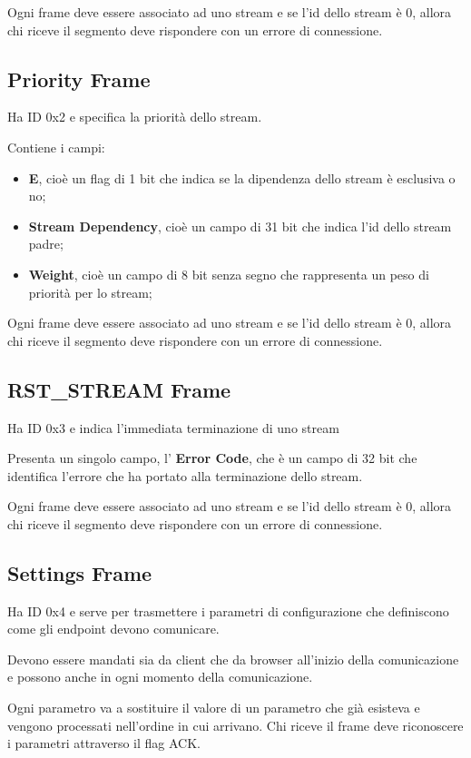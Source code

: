 \documentclass[12pt, a4paper]{article} %
\begin{document}
Ogni frame deve essere associato ad uno stream e se l'id dello stream è 0, allora chi riceve il segmento deve rispondere con un errore di connessione.

\subsection{Priority Frame}
Ha ID 0x2 e specifica la priorità dello stream.

Contiene i campi:
\begin{itemize}
  \item \textbf{E}, cioè un flag di 1 bit che indica se la dipendenza dello stream è esclusiva o no;
  \item \textbf{Stream Dependency}, cioè un campo di 31 bit che indica l'id dello stream padre;
  \item \textbf{Weight}, cioè un campo di 8 bit senza segno che rappresenta un peso di priorità per lo stream;
\end{itemize}

Ogni frame deve essere associato ad uno stream e se l'id dello stream è 0, allora chi riceve il segmento deve rispondere con un errore di connessione.

\subsection{RST\_STREAM Frame}
Ha ID 0x3 e indica l'immediata terminazione di uno stream

Presenta un singolo campo, l' \textbf{Error Code}, che è un campo di 32 bit che identifica l'errore che ha portato alla terminazione dello stream.

Ogni frame deve essere associato ad uno stream e se l'id dello stream è 0, allora chi riceve il segmento deve rispondere con un errore di connessione.

\subsection{Settings Frame}
Ha ID 0x4 e serve per trasmettere i parametri di configurazione che definiscono come gli endpoint devono comunicare.

Devono essere mandati sia da client che da browser all'inizio della comunicazione e possono anche in ogni momento della comunicazione.

Ogni parametro va a sostituire il valore di un parametro che già esisteva e vengono processati nell'ordine in cui arrivano.
Chi riceve il frame deve riconoscere i parametri attraverso il flag ACK.
\end{document}
